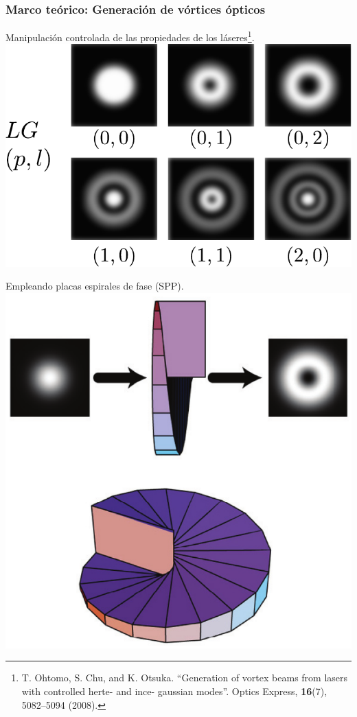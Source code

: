\documentclass[serif,8pt]{beamer}
\begin{document}
		\begin{frame}
		
		\frametitle{Marco teórico: Generación de vórtices ópticos}
\begin{multicols}{3}
			\vfill
			\centering Manipulación controlada de las propiedades de los láseres\footnote{T. Ohtomo, S. Chu, and K. Otsuka. ``Generation of vortex beams from lasers with controlled herte- and ince- gaussian modes''. Optics Express, \textbf{16}(7), 5082–5094 (2008).}.
			\vspace*{30pt}\includegraphics[scale=0.25]{img/LGmodos.pdf}
			\vfill
			
			\newpage
			\vfill
			\centering Empleando placas espirales de fase (SPP)\footnotemark[1]. 
			\includegraphics[scale=0.25
			]{img/SPP.eps}
			

\end{multicols}
\end{frame}
\end{document}
